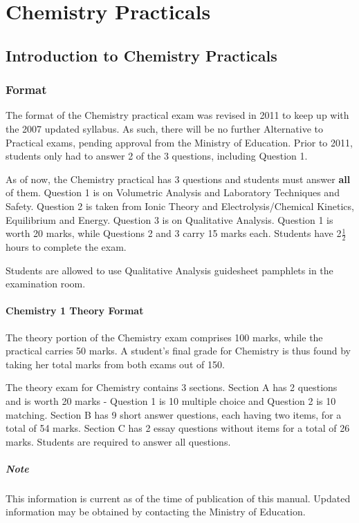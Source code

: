 \chapter{Chemistry Practicals} 

\section{Introduction to Chemistry Practicals}

\subsection{Format}
The format of the Chemistry practical exam was revised in 2011 to keep up with the 2007 updated syllabus. As such, there will be no further Alternative to Practical exams, pending approval from the Ministry of Education. Prior to 2011, students only had to answer 2 of the 3 questions, including Question 1.

As of now, the Chemistry practical has 3 questions and students must answer \textbf{all} of them. Question 1 is on Volumetric Analysis and Laboratory Techniques and Safety. Question 2 is taken from Ionic Theory and Electrolysis\slash Chemical Kinetics, Equilibrium and Energy. Question 3 is on Qualitative Analysis. Question 1 is worth 20 marks, while Questions 2 and 3 carry 15 marks each. Students have 2$\frac{1}{2}$ hours to complete the exam.

Students are allowed to use Qualitative Analysis guidesheet pamphlets in the examination room.

\subsubsection{Chemistry 1 Theory Format}
The theory portion of the Chemistry exam comprises 100 marks, while the practical carries 50 marks. A student's final grade for Chemistry is thus found by taking her total marks from both exams out of 150.

The theory exam for Chemistry contains 3 sections. Section A has 2 questions and is worth 20 marks - Question 1 is 10 multiple choice and Question 2 is 10 matching. Section B has 9 short answer questions, each having two items, for a total of 54 marks. Section C has 2 essay questions without items for a total of 26 marks. Students are required to answer all questions.

\paragraph{Note} This information is current as of the time of publication of this manual. Updated information may be obtained by contacting the Ministry of Education.

